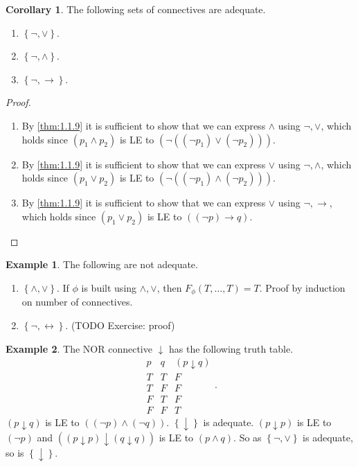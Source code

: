 \documentclass{article}
\newcommand{\rb}[1]{\left( #1 \right)}
\newcommand{\cb}[1]{\left\{ #1 \right\}}
\newcommand{\notb}[1]{\rb{\neg #1}}
\newcommand{\orb}[2]{\rb{#1 \lor #2}}
\newcommand{\andb}[2]{\rb{#1 \land #2}}
\newcommand{\impb}[2]{\rb{#1 \rightarrow #2}}
\theoremstyle{definition}\newtheorem{definition}{Definition}[subsection]
\theoremstyle{definition}\newtheorem{remark}[definition]{Remark}
\theoremstyle{definition}\newtheorem*{example}{Example}
\theoremstyle{definition}\newtheorem*{note}{Note}
\newtheorem{corollary}[definition]{Corollary}
\begin{document}
\begin{corollary}
The following sets of connectives are adequate.
\begin{enumerate}
\item $ \cb{\neg, \lor} $.
\item $ \cb{\neg, \land} $.
\item $ \cb{\neg, \rightarrow} $.
\end{enumerate}
\end{corollary}

\begin{proof}
\hfill
\begin{enumerate}
\item By \ref{thm:1.1.9} it is sufficient to show that we can express $ \land $ using $ \neg, \lor $, which holds since $ \andb{p_1}{p_2} $ is LE to $ \notb{\orb{\notb{p_1}}{\notb{p_2}}} $.
\item By \ref{thm:1.1.9} it is sufficient to show that we can express $ \lor $ using $ \neg, \land $, which holds since $ \orb{p_1}{p_2} $ is LE to $ \notb{\andb{\notb{p_1}}{\notb{p_2}}} $.
\item By \ref{thm:1.1.9} it is sufficient to show that we can express $ \lor $ using $ \neg, \rightarrow $, which holds since $ \orb{p_1}{p_2} $ is LE to $ \impb{\notb{p}}{q} $.
\end{enumerate}
\end{proof}


\begin{example}
The following are not adequate.
\begin{enumerate}
\item $ \cb{\land, \lor} $. If $ \phi $ is built using $ \land, \lor $, then $ F_\phi\rb{T, \dots, T} = T $. Proof by induction on number of connectives.
\item $ \cb{\neg, \leftrightarrow} $. (TODO Exercise: proof)
\end{enumerate}
\end{example}

\begin{example}
The NOR connective $ \downarrow $ has the following truth table.
$$
\begin{array}{cc|c}
p & q & \rb{p \downarrow q} \\
\hline
T & T & F \\
T & F & F \\
F & T & F \\
F & F & T
\end{array}.
$$
$ \rb{p \downarrow q} $ is LE to $ \andb{\notb{p}}{\notb{q}} $. $ \cb{\downarrow} $ is adequate. $ \rb{p \downarrow p} $ is LE to $ \notb{p} $ and $ \rb{\rb{p \downarrow p} \downarrow \rb{q \downarrow q}} $ is LE to $ \andb{p}{q} $. So as $ \cb{\neg, \lor} $ is adequate, so is $ \cb{\downarrow} $.
\end{example}
\end{document}
